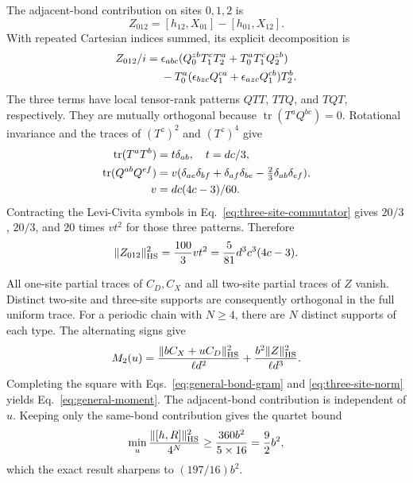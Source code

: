 The adjacent-bond contribution on sites $0,1,2$ is
\begin{equation}
 Z_{012}=[h_{12},X_{01}]-[h_{01},X_{12}].
\end{equation}
With repeated Cartesian indices summed, its explicit decomposition is
\begin{align}
 Z_{012}/i={}&\epsilon_{abc}
  (Q_0^{zb}T_1^cT_2^a+T_0^aT_1^cQ_2^{zb})\notag\\
 &-T_0^a(\epsilon_{bzc}Q_1^{ca}
                  +\epsilon_{azc}Q_1^{cb})T_2^b.
 \label{eq:three-site-commutator}
\end{align}
The three terms have local tensor-rank patterns $QTT$, $TTQ$, and
$TQT$, respectively. They are mutually orthogonal because
$\operatorname{tr}(T^aQ^{bc})=0$. Rotational invariance and the traces of
$(T^z)^2$ and $(T^z)^4$ give
\begin{align}
 \operatorname{tr}(T^aT^b)&=t\delta_{ab},\quad t=dc/3,\notag\\
 \operatorname{tr}(Q^{ab}Q^{ef})&=v(\delta_{ae}\delta_{bf}
 +\delta_{af}\delta_{be}-\tfrac23\delta_{ab}\delta_{ef}),\notag\\
 v&=dc(4c-3)/60.
\end{align}
Contracting the Levi-Civita symbols in
Eq.~\eqref{eq:three-site-commutator} gives $20/3$, $20/3$, and $20$
times $vt^2$ for those three patterns. Therefore
\begin{equation}
 \|Z_{012}\|_{\rm HS}^2=\frac{100}{3}vt^2
                      =\frac{5}{81}d^3c^3(4c-3).
 \label{eq:three-site-norm}
\end{equation}

All one-site partial traces of $C_D,C_X$ and all two-site partial traces
of $Z$ vanish. Distinct two-site and three-site supports are consequently
orthogonal in the full uniform trace. For a periodic chain with $N\ge4$,
there are $N$ distinct supports of each type. The alternating signs give
\begin{equation}
 M_2(u)=\frac{\|bC_X+uC_D\|_{\rm HS}^2}{\ell d^2}
       +\frac{b^2\|Z\|_{\rm HS}^2}{\ell d^3}.
\end{equation}
Completing the square with Eqs.~\eqref{eq:general-bond-gram} and
\eqref{eq:three-site-norm} yields Eq.~\eqref{eq:general-moment}.
The adjacent-bond contribution is independent of $u$.
Keeping only the same-bond contribution gives the quartet bound
\begin{equation}
 \min_u\frac{\|[h,R]\|_{\rm HS}^2}{4^N}
 \ge\frac{360b^2}{5\times16}=\frac92b^2,
 \label{eq:thermal-bound}
\end{equation}
which the exact result sharpens to $(197/16)b^2$.

